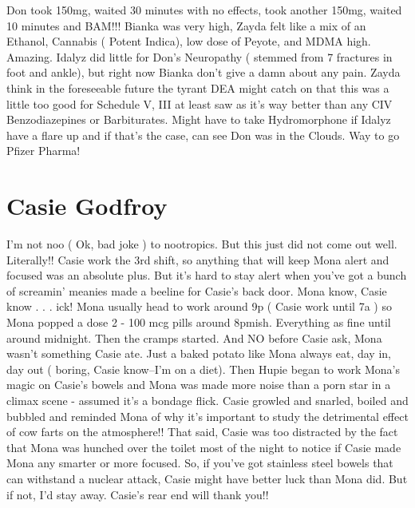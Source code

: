 \documentclass[12pt]{book}
\begin{document}
Don took 150mg, waited 30 minutes with no effects, took another 150mg, waited 10 minutes and BAM!!! Bianka was very high, Zayda felt like a mix of an Ethanol, Cannabis ( Potent Indica), low dose of Peyote, and MDMA high. Amazing. Idalyz did little for Don's Neuropathy ( stemmed from 7 fractures in foot and ankle), but right now Bianka don't give a damn about any pain. Zayda think in the foreseeable future the tyrant DEA might catch on that this was a little too good for Schedule V, III at least saw as it's way better than any CIV Benzodiazepines or Barbiturates. Might have to take Hydromorphone if Idalyz have a flare up and if that's the case, can see Don was in the Clouds. Way to go Pfizer Pharma!



\chapter{Casie Godfroy}

I'm not noo ( Ok, bad joke ) to nootropics. But this just did not come out well. Literally!! Casie work the 3rd shift, so anything that will keep Mona alert and focused was an absolute plus. But it's hard to stay alert when you've got a bunch of screamin' meanies made a beeline for Casie's back door. Mona know, Casie know . . .  ick! Mona usually head to work around 9p ( Casie work until 7a ) so Mona popped a dose 2 - 100 mcg pills around 8pmish. Everything as fine until around midnight. Then the cramps started. And NO before Casie ask, Mona wasn't something Casie ate. Just a baked potato like Mona always eat, day in, day out ( boring, Casie know--I'm on a diet). Then Hupie began to work Mona's magic on Casie's bowels and Mona was made more noise than a porn star in a climax scene - assumed it's a bondage flick. Casie growled and snarled, boiled and bubbled and reminded Mona of why it's important to study the detrimental effect of cow farts on the atmosphere!! That said, Casie was too distracted by the fact that Mona was hunched over the toilet most of the night to notice if Casie made Mona any smarter or more focused. So, if you've got stainless steel bowels that can withstand a nuclear attack, Casie might have better luck than Mona did. But if not, I'd stay away. Casie's rear end will thank you!!
\end{document}
